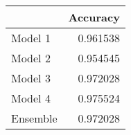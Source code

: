 \begin{tabular}{lr}
\toprule
{} &  Accuracy \\
\midrule
Model 1  &  0.961538 \\
Model 2  &  0.954545 \\
Model 3  &  0.972028 \\
Model 4  &  0.975524 \\
Ensemble &  0.972028 \\
\bottomrule
\end{tabular}

